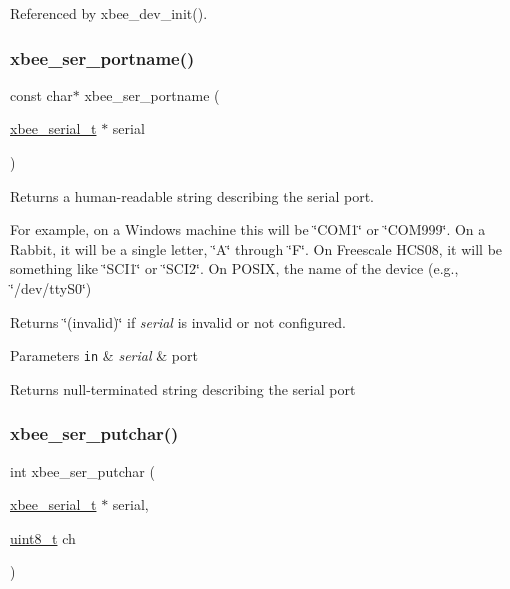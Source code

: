 Referenced by xbee\+\_\+dev\+\_\+init().

\mbox{\label{group__hal__dos_ga898057d1b7645785e7f3d6256828d039}} 
\subsubsection{\texorpdfstring{xbee\+\_\+ser\+\_\+portname()}{xbee\_ser\_portname()}}
{\footnotesize\ttfamily const char$\ast$ xbee\+\_\+ser\+\_\+portname (\begin{DoxyParamCaption}\item[{\hyperlink{structxbee__serial__t}{xbee\+\_\+serial\+\_\+t} $\ast$}]{serial }\end{DoxyParamCaption})}



Returns a human-\/readable string describing the serial port. 

For example, on a Windows machine this will be \char`\"{}\+C\+O\+M1\char`\"{} or \char`\"{}\+C\+O\+M999\char`\"{}. On a Rabbit, it will be a single letter, \char`\"{}\+A\char`\"{} through \char`\"{}\+F\char`\"{}. On Freescale H\+C\+S08, it will be something like \char`\"{}\+S\+C\+I1\char`\"{} or \char`\"{}\+S\+C\+I2\char`\"{}. On P\+O\+S\+IX, the name of the device (e.\+g., \char`\"{}/dev/tty\+S0\char`\"{})

Returns \char`\"{}(invalid)\char`\"{} if {\itshape serial} is invalid or not configured.


\begin{DoxyParams}[1]{Parameters}
\mbox{\tt in}  & {\em serial} & port\\
\hline
\end{DoxyParams}
\begin{DoxyReturn}{Returns}
null-\/terminated string describing the serial port 
\end{DoxyReturn}
\mbox{\label{group__hal__dos_ga86fea2345efb8bf9424228f0979b1849}} 
\subsubsection{\texorpdfstring{xbee\+\_\+ser\+\_\+putchar()}{xbee\_ser\_putchar()}}
{\footnotesize\ttfamily int xbee\+\_\+ser\+\_\+putchar (\begin{DoxyParamCaption}\item[{\hyperlink{structxbee__serial__t}{xbee\+\_\+serial\+\_\+t} $\ast$}]{serial,  }\item[{\hyperlink{group__hal__dos_gae1affc9ca37cfb624959c866a73f83c2}{uint8\+\_\+t}}]{ch }\end{DoxyParamCaption})}



